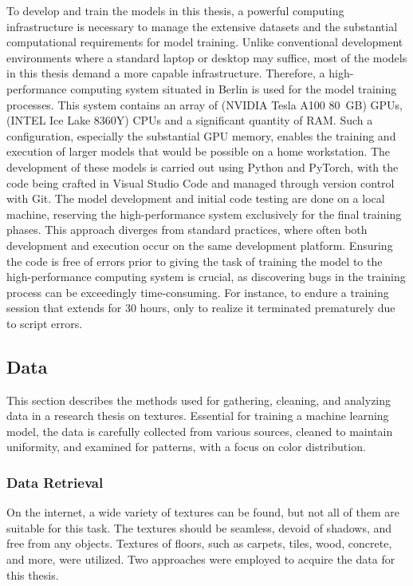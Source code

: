 To develop and train the models in this thesis, a powerful computing infrastructure is necessary to manage the extensive datasets and the substantial computational requirements for model training. Unlike conventional development environments where a standard laptop or desktop may suffice, most of the models in this thesis demand a more capable infrastructure. Therefore, a high-performance computing system situated in Berlin is used for the model training processes. This system contains an array of (NVIDIA Tesla A100 80 GB) GPUs, (INTEL Ice Lake 8360Y) CPUs and a significant quantity of RAM. Such a configuration, especially the substantial GPU memory, enables the training and execution of larger models that would be possible on a home workstation. The development of these models is carried out using Python and PyTorch, with the code being crafted in Visual Studio Code and managed through version control with Git. The model development and initial code testing are done on a local machine, reserving the high-performance system exclusively for the final training phases. This approach diverges from standard practices, where often both development and execution occur on the same development platform. Ensuring the code is free of errors prior to giving the task of training the model to the high-performance computing system is crucial, as discovering bugs in the training process can be exceedingly time-consuming. For instance, to endure a training session that extends for 30 hours, only to realize it terminated prematurely due to script errors.

\subsection{Data}
    
This section describes the methods used for gathering, cleaning, and analyzing data in a research thesis on textures. Essential for training a machine learning model, the data is carefully collected from various sources, cleaned to maintain uniformity, and examined for patterns, with a focus on color distribution.


\subsubsection{Data Retrieval}
On the internet, a wide variety of textures can be found, but not all of them are suitable for this task. The textures should be seamless, devoid of shadows, and free from any objects. Textures of floors, such as carpets, tiles, wood, concrete, and more, were utilized. Two approaches were employed to acquire the data for this thesis.

